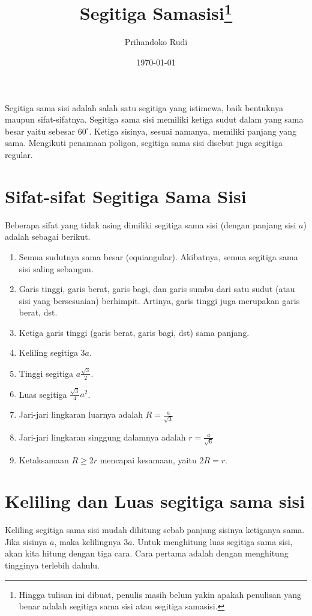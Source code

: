 \documentclass[12pt]{article}
\title{Segitiga Samasisi\footnote{Hingga tulisan ini dibuat, penulis masih belum yakin apakah penulisan yang benar adalah segitiga sama sisi atau segitiga samasisi.}}
\author{Prihandoko Rudi}
\date{\today}
\begin{document}
\maketitle


\noindent Segitiga sama sisi adalah salah satu segitiga yang istimewa, baik bentuknya  maupun sifat-sifatnya. Segitiga sama sisi memiliki ketiga sudut dalam yang sama besar yaitu sebesar $60^\circ$. Ketiga sisinya, sesuai namanya, memiliki panjang yang sama. Mengikuti penamaan poligon, segitiga sama sisi disebut juga segitiga regular. 

\section*{Sifat-sifat Segitiga Sama Sisi}

Beberapa sifat yang tidak asing dimiliki segitiga sama sisi (dengan panjang sisi $a$) adalah sebagai berikut. 

\begin{enumerate}
	\item Semua sudutnya sama besar (equiangular). Akibatnya, semua segitiga sama sisi saling sebangun.
	\item Garis tinggi, garis berat, garis bagi, dan garis sumbu dari satu sudut (atau sisi yang bersesuaian) berhimpit. Artinya, garis tinggi juga merupakan garis berat, dst. 
	\item Ketiga garis tinggi (garis berat, garis bagi, dst) sama panjang.
	\item Keliling segitiga $3a$.
	\item Tinggi segitiga $a\frac{\sqrt{3}}{2}$.
	\item Luas segitiga $\frac{\sqrt{3}}{4}a^2$.
	\item Jari-jari lingkaran luarnya adalah $R = \frac{a}{\sqrt{3}}$
	\item Jari-jari lingkaran singgung dalamnya adalah $r = \frac{a}{\sqrt{6}}$
	\item Ketaksamaan $R \geq 2r$ mencapai kesamaan, yaitu $2R = r$.
\end{enumerate}

\section*{Keliling dan Luas segitiga sama sisi}

Keliling segitiga sama sisi mudah dihitung sebab panjang sisinya ketiganya sama. Jika sisinya $a$, maka kelilingnya $3a$. Untuk menghitung luas segitiga sama sisi, akan kita hitung dengan tiga cara. Cara pertama adalah dengan menghitung tingginya terlebih dahulu. 
\end{document}
